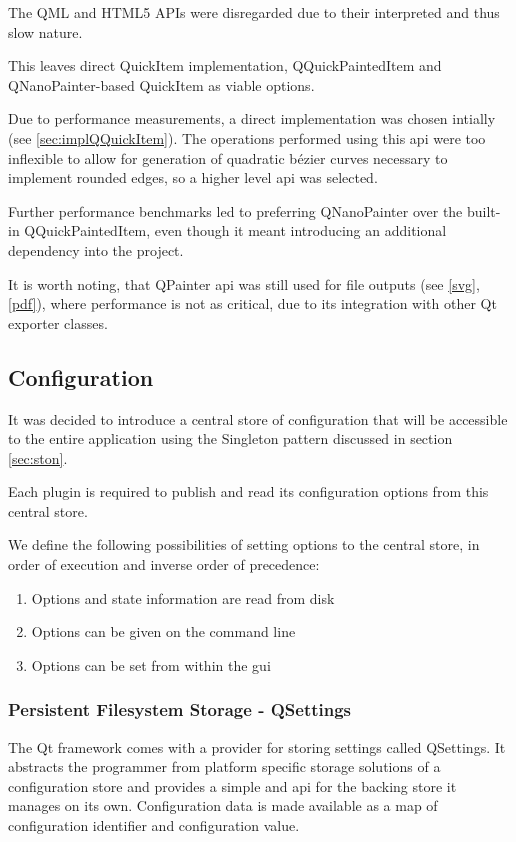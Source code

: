 The QML and HTML5 APIs were disregarded due to their interpreted and thus slow nature.

This leaves direct QuickItem implementation, QQuickPaintedItem and QNanoPainter-based QuickItem as viable options.

Due to performance measurements, a direct implementation was chosen intially (see \ref{sec:implQQuickItem}). The operations performed using this \gls{api} were too inflexible to allow for generation of quadratic bézier curves necessary to implement rounded edges, so a higher level \gls{api} was selected.

Further performance benchmarks led to preferring QNanoPainter over the built-in QQuickPaintedItem, even though it meant introducing an additional dependency into the project.

It is worth noting, that QPainter \gls{api} was still used for file outputs (see \ref{svg}, \ref{pdf}), where performance is not as critical, due to its integration with other Qt exporter classes.

\subsection{Configuration}\label{sec:archconf}
It was decided to introduce a central store of configuration that will be accessible to the entire application using the Singleton pattern discussed in section \ref{sec:ston}.

Each plugin is required to publish and read its configuration options from this central store.

We define the following possibilities of setting options to the central store, in order of execution and inverse order of precedence:
\begin{enumerate}
	\item Options and state information are read from disk
	\item Options can be given on the command line
	\item Options can be set from within the \gls{gui}
\end{enumerate}

\subsubsection{Persistent Filesystem Storage - QSettings}
The Qt framework comes with a provider for storing settings called QSettings. It abstracts the programmer from platform specific storage solutions of a configuration store and provides a simple  and  \gls{api} for the backing store it manages on its own. Configuration data is made available as a map of configuration identifier and configuration value.

